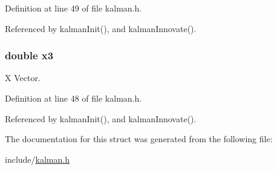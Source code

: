 Definition at line 49 of file kalman.\-h.



Referenced by kalman\-Init(), and kalman\-Innovate().

\hypertarget{struct_kalman_a98e99f64ddf7321e4eae52beca4b580f}{
\subsubsection[{x3}]{\setlength{\rightskip}{0pt plus 5cm}double x3}}\label{struct_kalman_a98e99f64ddf7321e4eae52beca4b580f}


X Vector. 



Definition at line 48 of file kalman.\-h.



Referenced by kalman\-Init(), and kalman\-Innovate().



The documentation for this struct was generated from the following file\-:\begin{DoxyCompactItemize}
\item 
include/\hyperlink{kalman_8h}{kalman.\-h}\end{DoxyCompactItemize}
